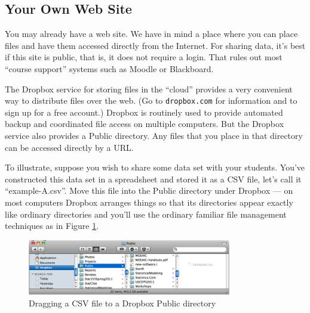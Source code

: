 \subsection{Your Own Web Site}

You may already have a web site.  We have in mind a place where you
can place files and have them accessed directly from the Internet.
For sharing data, it's best if this site is public, that is, it does not require a login.
That rules out most ``course support'' systems such as Moodle or
Blackboard.  
%

The Dropbox service for storing files in the ``cloud'' provides a very
convenient way to distribute files over the web.  (Go to
\texttt{dropbox.com} for information and to sign up for a free account.)
Dropbox is routinely used to provide automated backup and coordinated
file access on multiple computers.  But the Dropbox service also
provides a {\sc Public} directory.  Any files that you place in that
directory can be accessed directly by a URL.  

To illustrate, suppose you wish to share some data set with your
students.  You've constructed this data set in a spreadsheet and
stored it as a CSV file, let's call it ``example-A.csv''.  Move this
file into the {\sc Public} directory under Dropbox --- on most
computers Dropbox arranges things so that its directories appear
exactly like ordinary directories and you'll use the ordinary familiar
file management techniques as in Figure \ref{fig:dropbox1}.
\begin{figure}
\begin{center}
\includegraphics[width=3.5in]{images/dropbox1.png}
\end{center}
\caption{\label{fig:dropbox1} Dragging a CSV file to a Dropbox Public directory}
\end{figure}

